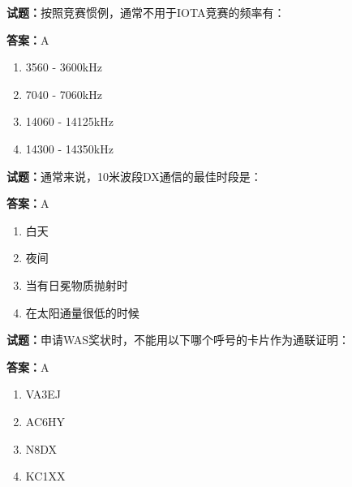 \documentclass{ctexbook}
\begin{document}




\vspace{1em}

\textbf{试题：}按照竞赛惯例，通常不用于IOTA竞赛的频率有： 

\textbf{答案：}A 

\begin{enumerate}[leftmargin=3em]
  \item 3560 - 3600kHz 

  \item 7040 - 7060kHz 

  \item 14060 - 14125kHz 

  \item 14300 - 14350kHz 

\end{enumerate}





\vspace{1em}

\textbf{试题：}通常来说，10米波段DX通信的最佳时段是： 

\textbf{答案：}A 

\begin{enumerate}[leftmargin=3em]
  \item 白天 

  \item 夜间 


  \item 当有日冕物质抛射时 

  \item 在太阳通量很低的时候 

\end{enumerate}





\vspace{1em}

\textbf{试题：}申请WAS奖状时，不能用以下哪个呼号的卡片作为通联证明： 

\textbf{答案：}A 

\begin{enumerate}[leftmargin=3em]
  \item VA3EJ 

  \item AC6HY 

  \item N8DX 

  \item KC1XX 

\end{enumerate}
\end{document}
